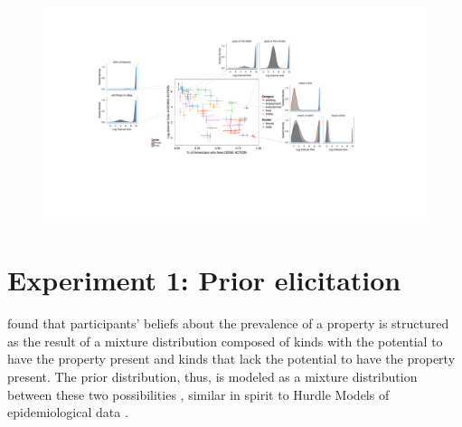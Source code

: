 \documentclass[10pt,letterpaper]{article}
\begin{document}




\begin{figure}[t]
\centering
  \includegraphics[width=\textwidth]{prior-scatter-insets}
  \caption{}
  \label{fig:priorScatter}
\end{figure}
%


\section{Experiment 1: Prior elicitation}

%



 found that participants' beliefs about the prevalence of a property is structured as the result of a mixture distribution composed of kinds with the potential to have the property present and kinds that lack the potential to have the property present.
The prior distribution, thus, is modeled as a mixture distribution between these two possibilities \cite{Griffiths2005}, similar in spirit to Hurdle Models of epidemiological data \cite{hurdleModels}.
\end{document}

